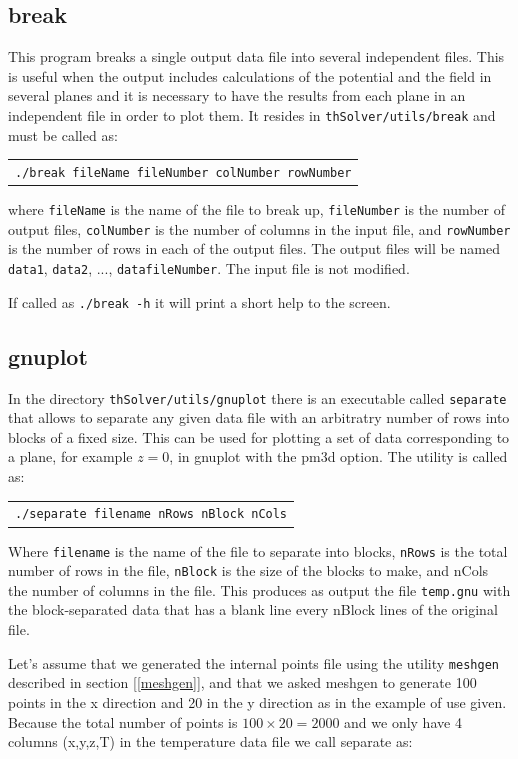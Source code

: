 \documentclass[12pt]{article}
\begin{document}
\subsection{break}
This program breaks a single output data file into several independent files. This is useful when the output includes calculations of the potential and the field in several planes and it is necessary to have the results from each plane in an independent file in order to plot them. It resides in \verb+thSolver/utils/break+ and must be called as:

\begin{tabular}{l}
\texttt{./break fileName fileNumber colNumber rowNumber}
\end{tabular}

where \verb+fileName+ is the name of the file to break up, \verb+fileNumber+ is the number of output files, \verb+colNumber+ is the number of columns in the input file, and \verb+rowNumber+ is the number of rows in each of the output files. The output files will be named \verb+data1+, \verb+data2+, ..., \verb+datafileNumber+. The input file is not modified.

If called as \verb+./break -h+ it will print a short help to the screen.

\subsection{gnuplot}
In the directory \verb+thSolver/utils/gnuplot+ there is an executable called \verb+separate+ that allows to separate any given data file with an arbitratry number of rows into blocks of a fixed size. This can be used for plotting a set of data corresponding to a plane, for example $z=0$, in gnuplot with the pm3d option. The utility is called as:

\begin{tabular}{l}
\texttt{./separate filename nRows nBlock nCols}
\end{tabular}

Where \verb+filename+ is the name of the file to separate into blocks, \verb+nRows+ is the total number of rows in the file, \verb+nBlock+ is the size of the blocks to make, and nCols the number of columns in the file. This produces as output the file \verb+temp.gnu+ with the block-separated data that has a blank line every nBlock lines of the original file.

Let's assume that we generated the internal points file using the utility \verb+meshgen+ described in section [\ref{meshgen}], and that we asked meshgen to generate 100 points in the x direction and 20 in the y direction as in the example of use given. Because the total number of points is $100\times20=2000$ and we only have 4 columns (x,y,z,T) in the temperature data file we call separate as:
\end{document}
